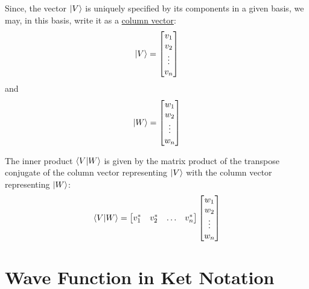 \documentclass{article}
\begin{document}
Since, the vector $\ket{V}$ is uniquely specified by its components in a given basis, we may, in this basis, write it as a \underline{column vector}:
\begin{equation}
    \ket{V} = \begin{bmatrix}
        v_{1}\\
        v_{2}\\
        \vdots\\
        v_{n}
    \end{bmatrix}
\end{equation}
and 
\begin{equation}
    \ket{W} = \begin{bmatrix}
        w_{1}\\
        w_{2}\\
        \vdots\\
        w_{n}
    \end{bmatrix}
\end{equation}
\newpage

The inner product $\braket{V}{W}$ is given by the matrix product of the transpose conjugate of the column vector representing $\ket{V}$ with the column vector representing $\ket{W}$:
\begin{equation}
    \braket{V}{W} = \begin{bmatrix}
        v_{1}^{*} & v_{2}^{*} & \hdots & v_{n}^{*}
    \end{bmatrix}\begin{bmatrix}
    w_{1}\\
        w_{2}\\
        \vdots\\
        w_{n}
\end{bmatrix}
\end{equation}

\section{Wave Function in Ket Notation}
\label{sec:Wave Function in Ket Notation}
\end{document}
